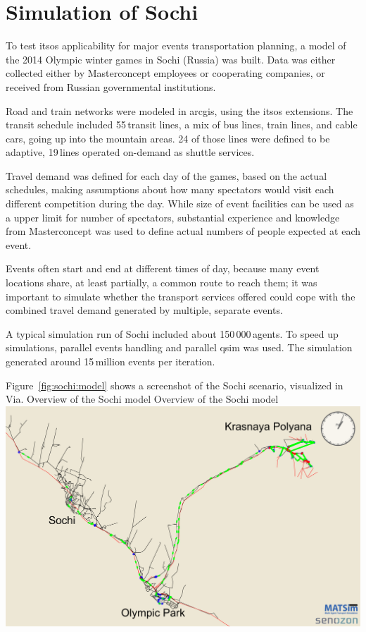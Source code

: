 \section{Simulation of Sochi}
To test \gls{itsos} applicability for major events transportation planning,
a model of the 2014 Olympic winter games in Sochi (Russia) was built. Data was
either collected either by Masterconcept employees or cooperating companies, or
received from Russian governmental institutions.

Road and train networks were modeled in \gls{arcgis}, using the \gls{itsos} extensions.
The transit schedule included 55\,transit lines, a mix of bus lines, train lines,
and cable cars, going up into the mountain areas. 24 of those lines were
defined to be adaptive, 19\,lines operated on-demand as shuttle services.

Travel demand was defined for each day of the games, based on the actual schedules,
making assumptions about how many spectators would visit each different
competition during the day. While size of event facilities can be used as a
upper limit for number of spectators, substantial experience and knowledge from
Masterconcept was used to define actual numbers of people expected at each
event.

Events often start and end at different times of day, because many event locations share, at least partially, a
common route to reach them; it was important to simulate whether the transport services offered could
cope with the combined travel demand generated by multiple, separate events.

A typical simulation run of Sochi included about 150\,000\,agents. To speed up simulations, parallel events handling and parallel qsim was used. The simulation generated around 15\,million events per iteration.

Figure~\ref{fig:sochi:model} shows a screenshot of the Sochi scenario, visualized in Via.
%
\createfigure%
{Overview of the Sochi model}%
{Overview of the Sochi model}%
{\label{fig:sochi:model}}%
{\includegraphics[width=1.\textwidth,angle=0]{./using/figures/sochi_full.pdf}}%
{}
%

